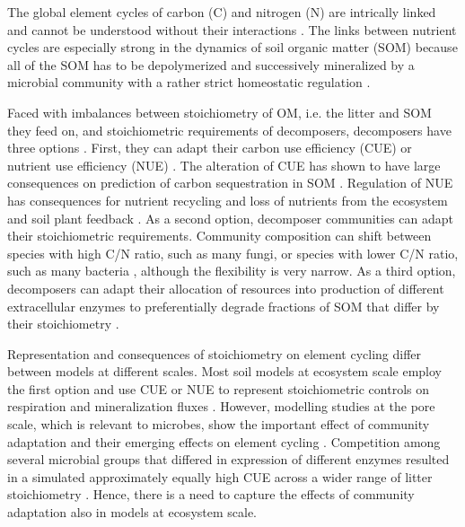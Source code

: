
\introduction 
The global element cycles of carbon (C) and nitrogen (N) are intrically linked
and cannot be understood without their interactions 
\citep{Thornton07,Janssens10, Zaehle11}%
. 
The links between nutrient cycles are especially strong
in the dynamics of soil organic matter (SOM) because all of the SOM has to be
depolymerized and successively mineralized by a microbial community with a
rather strict homeostatic regulation \citep{Sterner02, Zechmeister15}.

Faced with imbalances between stoichiometry of OM, i.e. the litter and SOM they
feed on, and stoichiometric requirements of decomposers, decomposers have three
options \citep{Mooshammer14}.
First, they can adapt their carbon use efficiency (CUE) or nutrient use
efficiency (NUE) \citep{Sinsabaugh13}. The alteration of CUE has shown to have
large consequences on prediction of carbon sequestration in SOM
\citep{Allison14a, Wieder13}.
Regulation of NUE has consequences for nutrient recycling and loss of nutrients
from the ecosystem \citep{Mooshammer14a} and soil plant feedback
\citep{Rastetter11}.
As a second option, decomposer communities can adapt their stoichiometric
requirements. Community composition can shift between species with high C/N
ratio, such as many fungi, or species with lower C/N ratio, such as many
bacteria \citep{Cleveland07, Xu13}, although the flexibility is very narrow.
As a third option, decomposers can adapt their allocation of resources into
production of different extracellular enzymes to preferentially degrade
fractions of SOM that differ by their stoichiometry \citep{Moorhead12}. 

Representation and consequences of stoichiometry on element cycling differ
between models at different scales. Most soil models at ecosystem scale
employ the first option and use CUE or NUE to represent stoichiometric controls
on respiration and mineralization fluxes \citep{Manzoni08}. However, modelling
studies at the pore scale, which is relevant to microbes, show the
important effect of community adaptation and their emerging effects on element cycling
\citep{Allison05, Resat11, Wang13}. Competition among several
microbial groups that differed in expression of different enzymes resulted in a
simulated approximately equally high CUE across a wider range of litter
stoichiometry \citep{Kaiser14}. Hence, there is a need to capture the effects of community
adaptation also in models at ecosystem scale.

